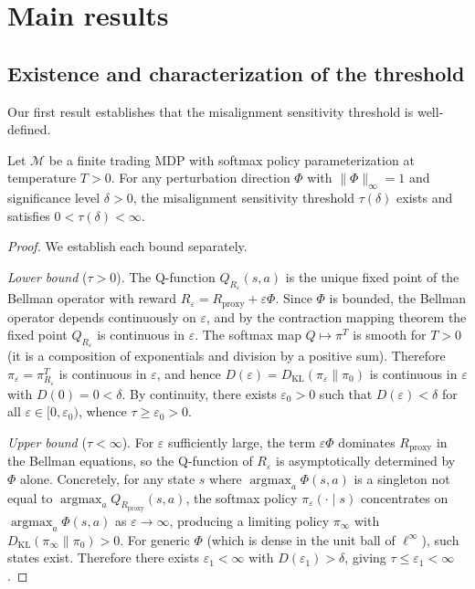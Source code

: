 \section{Main results}\label{sec:main}

\subsection{Existence and characterization of the threshold}

Our first result establishes that the misalignment sensitivity threshold is
well-defined.

\begin{theorem}[Existence]\label{thm:existence}
Let $\mathcal{M}$ be a finite trading MDP with softmax policy parameterization
at temperature $T > 0$. For any perturbation direction $\Phi$ with
$\lVert \Phi \rVert_\infty = 1$ and significance level $\delta > 0$, the
misalignment sensitivity threshold $\tau(\delta)$ exists and satisfies
$0 < \tau(\delta) < \infty$.
\end{theorem}

\begin{proof}
We establish each bound separately.

\emph{Lower bound} ($\tau > 0$). The Q-function $Q_{R_\varepsilon}(s,a)$ is
the unique fixed point of the Bellman operator with reward
$R_\varepsilon = R_{\mathrm{proxy}} + \varepsilon \Phi$. Since $\Phi$ is
bounded, the Bellman operator depends continuously on $\varepsilon$, and by
the contraction mapping theorem the fixed point $Q_{R_\varepsilon}$ is
continuous in $\varepsilon$. The softmax map $Q \mapsto \pi^T$ is smooth for
$T > 0$ (it is a composition of exponentials and division by a positive
sum). Therefore $\pi_\varepsilon = \pi_{R_\varepsilon}^T$ is continuous in
$\varepsilon$, and hence $D(\varepsilon) = D_{\mathrm{KL}}(\pi_\varepsilon
\| \pi_0)$ is continuous in $\varepsilon$ with $D(0) = 0 < \delta$. By
continuity, there exists $\varepsilon_0 > 0$ such that $D(\varepsilon) <
\delta$ for all $\varepsilon \in [0, \varepsilon_0)$, whence
$\tau \geq \varepsilon_0 > 0$.

\emph{Upper bound} ($\tau < \infty$). For $\varepsilon$ sufficiently large,
the term $\varepsilon \Phi$ dominates $R_{\mathrm{proxy}}$ in the Bellman
equations, so the Q-function of $R_\varepsilon$ is asymptotically determined
by $\Phi$ alone. Concretely, for any state $s$ where
$\operatorname{argmax}_a \Phi(s,a)$ is a singleton not equal to
$\operatorname{argmax}_a Q_{R_{\mathrm{proxy}}}(s,a)$, the softmax policy
$\pi_\varepsilon(\cdot \mid s)$ concentrates on
$\operatorname{argmax}_a \Phi(s,a)$ as $\varepsilon \to \infty$, producing a
limiting policy $\pi_\infty$ with $D_{\mathrm{KL}}(\pi_\infty \| \pi_0) > 0$.
For generic $\Phi$ (which is dense in the unit ball of $\ell^\infty$), such
states exist. Therefore there exists $\varepsilon_1 < \infty$ with
$D(\varepsilon_1) > \delta$, giving $\tau \leq \varepsilon_1 < \infty$.
\end{proof}

